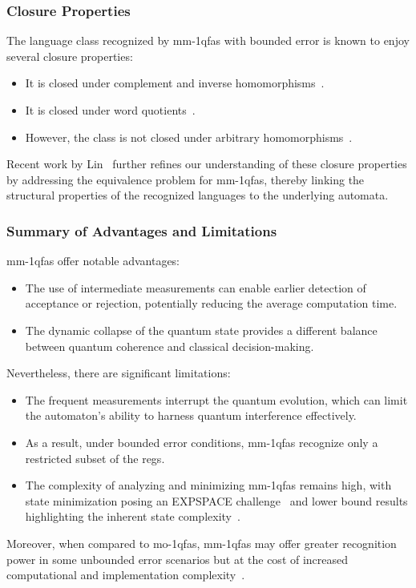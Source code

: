 \subsubsection{Closure Properties}
The language class recognized by \glspl{mm-1qfa} with bounded error is known to enjoy several closure properties:
\begin{itemize}
    \item It is closed under complement and inverse homomorphisms~\cite{brodsky2002characterizations}.
    \item It is closed under word quotients~\cite{brodsky2002characterizations}.
    \item However, the class is not closed under arbitrary homomorphisms~\cite{kondacs1997power,bertoni2003quantum}.
\end{itemize}
Recent work by Lin~\cite{lin2012another} further refines our understanding of these closure properties by addressing the equivalence problem for \glspl{mm-1qfa}, thereby linking the structural properties of the recognized languages to the underlying automata.

\subsubsection{Summary of Advantages and Limitations}
\glspl{mm-1qfa} offer notable advantages:
\begin{itemize}
    \item The use of intermediate measurements can enable earlier detection of acceptance or rejection, potentially reducing the average computation time.
    \item The dynamic collapse of the quantum state provides a different balance between quantum coherence and classical decision-making.
\end{itemize}
Nevertheless, there are significant limitations:
\begin{itemize}
    \item The frequent measurements interrupt the quantum evolution, which can limit the automaton's ability to harness quantum interference effectively.
    \item As a result, under bounded error conditions, \glspl{mm-1qfa} recognize only a restricted subset of the \glspl{reg}.
    \item The complexity of analyzing and minimizing \glspl{mm-1qfa} remains high, with state minimization posing an EXPSPACE challenge~\cite{mateus2012complexity} and lower bound results highlighting the inherent state complexity~\cite{ablayev2000lower}.
\end{itemize}
Moreover, when compared to \gls{mo-1qfa}s, \glspl{mm-1qfa} may offer greater recognition power in some unbounded error scenarios but at the cost of increased computational and implementation complexity~\cite{kondacs1997power,berzicna2001ambainis}.

